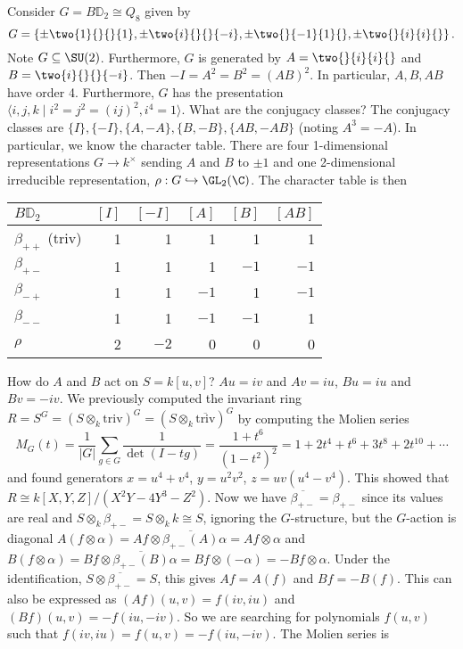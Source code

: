 \begin{ex}
Consider $G= B\mathbb{D}_2 \cong Q_8$ given by 
	\[
	G= \left\{ \pm \two{1}{}{}{1}, \pm \two{i}{}{}{-i}, \pm \two{}{-1}{1}{}, \pm \two{}{i}{i}{} \right\}.
	\]
Note $G \subseteq \SU(2)$. Furthermore, $G$ is generated by $A= \two{}{i}{i}{}$ and $B= \two{i}{}{}{-i}$. Then $-I= A^2= B^2= (AB)^2$. In particular, $A,B, AB$ have order 4. Furthermore, $G$ has the presentation $\langle i,j,k \;|\; i^2=j^2=(ij)^2, i^4=1 \rangle$. What are the conjugacy classes? The conjugacy classes are $\{I\}, \{-I\}, \{A,-A\}, \{B,-B\}, \{AB,-AB\}$ (noting $A^3= -A$). In particular, we know the character table. There are four 1-dimensional representations $G \to k^\times$ sending $A$ and $B$ to $\pm 1$ and one 2-dimensional irreducible representation, $\rho: G \hookrightarrow \GL_2(\C)$. The character table is then
	\begin{table}[htb]
	\centering
	\begin{tabular}{l|rrrrr}
	$B\mathbb{D}_2$ &  $[I]$ & $[-I]$ & $[A]$ & $[B]$ & $[AB]$ \\ \hline
	$\beta_{++}$ (triv) & 1 & 1 & 1  & 1 & 1 \\
	$\beta_{+-}$ & 1 & 1 & 1 & $-1$ & $-1$ \\
	$\beta_{-+}$ & 1 & 1 & $-1$ & 1 & $-1$ \\
	$\beta_{--}$ & 1 & 1 & $-1$ & $-1$ & 1 \\
	$\rho$ & 2 & $-2$ & 0 & 0 & 0 
	\end{tabular}
	\end{table}
How do $A$ and $B$ act on $S= k[u,v]$? $Au= iv$ and $Av= iu$, $Bu = iu$ and $Bv= -iv$. We previously computed the invariant ring $R= S^G= (S \otimes_k \text{triv})^G= (S \otimes_k \overline{\text{triv}})^G$ by computing the Molien series 
	\[
	M_G(t)= \dfrac{1}{|G|} \sum_{g \in G} \dfrac{1}{\det(I-tg)}= \dfrac{1+t^6}{(1-t^2)^2}= 1 + 2t^4 + t^6 + 3t^8 + 2t^{10} + \cdots
	\]
and found generators $x= u^4+v^4$, $y= u^2v^2$, $z= uv(u^4-v^4)$. This showed that $R \cong k[X,Y,Z]/(X^2Y-4Y^3-Z^2)$. Now we have $\overline{\beta_{+-}}= \beta_{+-}$ since its values are real and $S \otimes_k \beta_{+-}= S \otimes_k k \cong S$, ignoring the $G$-structure, but the $G$-action is diagonal $A(f \otimes \alpha)= Af \otimes \overline{\beta_{+-}(A)} \alpha= Af \otimes \alpha$ and $B(f \otimes \alpha)= Bf \otimes \overline{\beta_{+-}(B)} \alpha= Bf \otimes (-\alpha)= -Bf \otimes \alpha$. Under the identification, $S \otimes \overline{\beta_{+-}}= S$, this gives $Af= A(f)$ and $Bf= -B(f)$. This can also be expressed as $(Af)(u,v)= f(iv,iu)$ and $(Bf)(u,v)= -f(iu,-iv)$. So we are searching for polynomials $f(u,v)$ such that $f(iv,iu)= f(u,v)= -f(iu,-iv)$. The Molien series is 

\end{ex}
